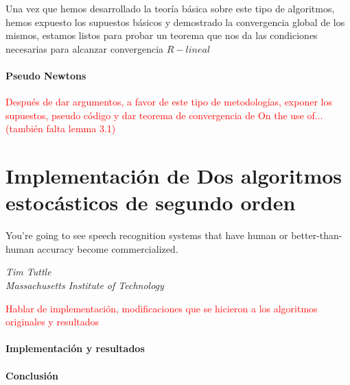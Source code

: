 \documentclass{book}
\theoremstyle{plain}
\theoremstyle{definition}
\theoremstyle{remark}
\begin{document}
Una vez que hemos desarrollado la teoría básica sobre este tipo de algoritmos, hemos expuesto los supuestos básicos y demostrado la convergencia global de los mismos, estamos listos para probar un teorema que nos da las condiciones necesarias para alcanzar convergencia $R-lineal$




\subsubsection{Pseudo Newtons}

\textcolor{red}{Después de dar argumentos, a favor de este tipo de metodologías, exponer los supuestos, pseudo código y dar teorema de convergencia de On the use of... (también falta lemma 3.1)}

\chapter{Implementación de Dos algoritmos estocásticos de segundo orden}


\epigraph{You're going to see speech recognition systems that have human or better-than-human accuracy become commercialized.}{\textit{Tim Tuttle \\ Massachusetts Institute of Technology}}

\newpage

\textcolor{red}{Hablar de implementación, modificaciones que se hicieron a los algoritmos originales y resultados}

\subsubsection{Implementación y resultados}

\subsubsection{Conclusión}
\end{document}
